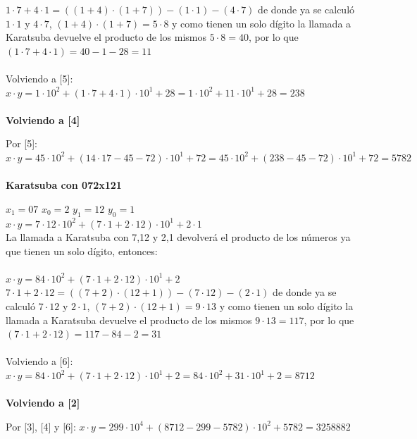\documentclass[titlepage,a4paper]{article}
\begin{document}
$1 \cdot7 + 4\cdot1 = ((1+4)\cdot (1+7)) - (1\cdot 1) - (4\cdot 7)$  de donde ya se calculó $1\cdot 1$ y $4\cdot 7$, $(1+4)\cdot (1+7) = 5\cdot8$ y como tienen un solo dígito la llamada a Karatsuba devuelve el producto de los mismos $5\cdot8=40$, por lo que $ (1\cdot 7 + 4 \cdot 1) = 40 - 1 - 28 = 11 $ \\ \\
Volviendo a [5]: $x\cdot y= 1 \cdot 10^2 + (1\cdot 7 + 4 \cdot 1)\cdot 10^1 + 28 = 1 \cdot 10^2 + 11\cdot 10^1 + 28 = 238$ \\ \\


\textbf{Volviendo a [4]} \par
Por [5]: \qquad $x\cdot y= 45 \cdot 10^2 + (14\cdot17 - 45 - 72)\cdot 10^1 + 72 = 45 \cdot 10^2 + (238 - 45 - 72)\cdot 10^1 + 72 = 5782 $ \\ \\


\textbf{Karatsuba con 072x121} \par
\qquad $x_1=07$ \quad $x_0=2$ \quad $y_1=12$ \quad $y_0=1$ \\
$x\cdot y= 7 \cdot 12 \cdot 10^2 + (7\cdot 1 + 2 \cdot 12)\cdot 10^1 + 2\cdot 1$ \\

La llamada a Karatsuba con 7,12 y 2,1 devolverá el producto de los números ya que tienen un solo dígito, entonces: \\ \\
$x\cdot y= 84\cdot 10^2 + (7\cdot 1 + 2 \cdot 12)\cdot 10^1 + 2 $ \qquad [6] \\

$7 \cdot1 + 2\cdot12 = ((7+2)\cdot (12+1)) - (7\cdot 12) - (2\cdot 1)$  de donde ya se calculó $7\cdot 12$ y $2\cdot 1$, $(7+2)\cdot (12+1) = 9\cdot13$ y como tienen un solo dígito la llamada a Karatsuba devuelve el producto de los mismos $9\cdot13=117$, por lo que $ (7 \cdot1 + 2\cdot12) = 117 - 84 - 2 = 31 $ \\ \\
Volviendo a [6]: $x\cdot y= 84\cdot 10^2 + (7\cdot 1 + 2 \cdot 12)\cdot 10^1 + 2  = 84 \cdot 10^2 + 31\cdot 10^1 + 2 = 8712$ \\ \\


\textbf{Volviendo a [2]} \par
Por [3], [4] y [6]: \qquad $x\cdot y= 299 \cdot 10^4 + (8712 - 299 - 5782)\cdot 10^2 + 5782 = 3258882$ \\ \\
\end{document}
